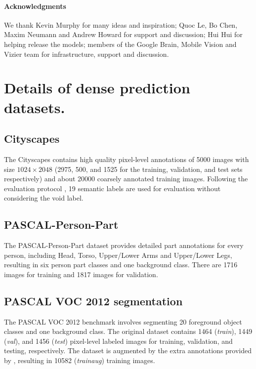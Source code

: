 \documentclass{article}
\begin{document}
\paragraph{Acknowledgments}
We thank Kevin Murphy for many ideas and inspiration; Quoc Le, Bo Chen, Maxim Neumann and Andrew Howard for support and discussion; Hui Hui for helping release the models; members of the Google Brain, Mobile Vision and Vizier team for infrastructure, support and discussion.









 
{\small


}

\newpage
\appendix

\section{Details of dense prediction datasets.}

\subsection{Cityscapes}

The Cityscapes \cite{Cordts2016Cityscapes} contains high quality pixel-level annotations of 5000 images with size $1024\times 2048$ (2975, 500, and 1525 for the training, validation, and test sets respectively) and about 20000 coarsely annotated training images. Following the evaluation protocol \cite{Cordts2016Cityscapes}, 19 semantic labels are used for evaluation without considering the void label.

\subsection{PASCAL-Person-Part}

The PASCAL-Person-Part dataset \cite{chen_cvpr14} provides detailed part annotations for every person, including Head, Torso, Upper/Lower Arms and Upper/Lower Legs, resulting in six person part classes and one background class. There are 1716 images for training and 1817 images for validation.

\subsection{PASCAL VOC 2012 segmentation}

The PASCAL VOC 2012 benchmark
\cite{everingham2014pascal} involves segmenting 20 foreground object classes and one background class.
The original dataset contains 1464 (\textit{train}), 1449 (\textit{val}), and 1456 (\textit{test}) pixel-level labeled images for training, validation, and testing, respectively. The dataset is augmented by the extra annotations provided by \cite{hariharan2011semantic}, resulting in 10582 (\textit{trainaug}) training images.
\end{document}
